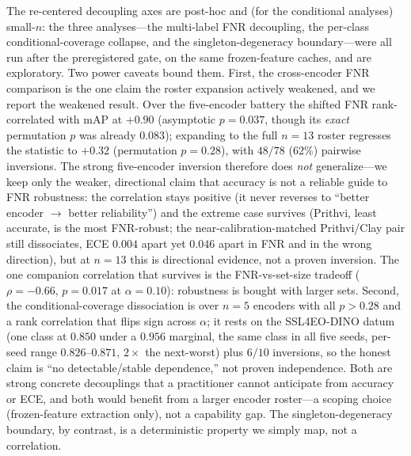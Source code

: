 \documentclass[11pt]{article}
\begin{document}
The re-centered decoupling axes are post-hoc and (for the conditional analyses) small-$n$: the three
analyses---the multi-label FNR decoupling, the per-class conditional-coverage collapse, and the
singleton-degeneracy boundary---were all run after the preregistered gate, on the same frozen-feature
caches, and are exploratory. Two power caveats bound them. First, the cross-encoder FNR
comparison is the one claim the roster expansion actively weakened, and we report the weakened result. Over
the five-encoder battery the shifted FNR rank-correlated with mAP at $+0.90$ (asymptotic $p{=}0.037$,
though its \emph{exact} permutation $p$ was already $0.083$); expanding to the full $n{=}13$ roster
regresses the statistic to $+0.32$ (permutation $p{=}0.28$), with $48/78$ ($62\%$) pairwise inversions.
The strong five-encoder inversion therefore does \emph{not} generalize---we keep only the weaker,
directional claim that accuracy is not a reliable guide to FNR robustness: the correlation stays
positive (it never reverses to ``better encoder $\to$ better reliability'') and the extreme case survives
(Prithvi, least accurate, is the most FNR-robust; the near-calibration-matched Prithvi/Clay pair still
dissociates, ECE $0.004$ apart yet $0.046$ apart in FNR and in the wrong direction), but at $n{=}13$ this is
directional evidence, not a proven inversion. The one companion correlation that survives is the
FNR-vs-set-size tradeoff ($\rho{=}-0.66$, $p{=}0.017$ at $\alpha{=}0.10$): robustness is bought with
larger sets. Second, the conditional-coverage dissociation is over
$n{=}5$ encoders with all $p>0.28$ and a rank correlation that flips sign across $\alpha$; it rests on the
SSL4EO-DINO datum (one class at $0.850$ under a $0.956$ marginal, the same class in all five seeds,
per-seed range $0.826$--$0.871$, $2\times$ the next-worst) plus $6/10$
inversions, so the honest claim is ``no detectable/stable dependence,'' not proven independence. Both are
strong concrete decouplings that a practitioner cannot anticipate from accuracy or ECE, and both
would benefit from a larger encoder roster---a scoping choice (frozen-feature extraction only), not a
capability gap. The singleton-degeneracy boundary, by contrast, is a deterministic property we simply
map, not a correlation.
\end{document}
